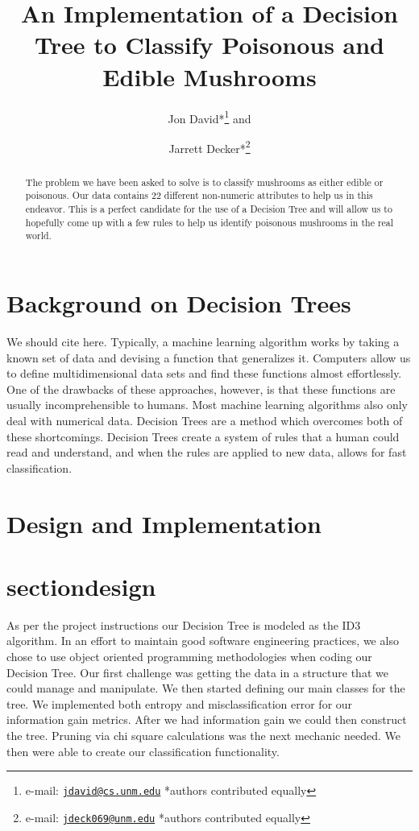 \documentclass{IEEEtran}
\author{Jon David*\thanks{e-mail:
    \href{mailto:jdavid@cs.unm.edu}
         {\texttt{jdavid@cs.unm.edu}}
         {*authors contributed equally}} and
\and
       Jarrett Decker*\thanks{e-mail:
    \href{mailto:p.s.ortegel@gmail.com}
         {\texttt{jdeck069@unm.edu}}
         {*authors contributed equally}}}
\title{An Implementation of a Decision Tree to Classify Poisonous and
  Edible Mushrooms}
\begin{document}
\maketitle

\begin{abstract}

The problem we have been asked to solve is to classify mushrooms as
either edible or poisonous. Our data contains 22 different non-numeric
attributes to help us in this endeavor. This is a perfect candidate
for the use of a Decision Tree and will allow us to hopefully come up
with a few rules to help us identify poisonous mushrooms in the real
world. 
\end{abstract}

\section{Background on Decision Trees}
We should cite \parencite{mitchell1997machine} here.
Typically, a machine learning algorithm works by taking a known set of
data and devising a function that generalizes it. Computers allow us
to define multidimensional data sets and find these functions almost
effortlessly. One of the drawbacks of these approaches, however, is
that these functions are usually incomprehensible to humans. Most
machine learning algorithms also only deal with numerical
data. Decision Trees are a method which overcomes both of these
shortcomings. Decision Trees create a system of rules that a human
could read and understand, and when the rules are applied to new data,
allows for fast classification.


\section{Design and Implementation}
\section{sectiondesign}
As per the project instructions our Decision Tree is modeled as the
ID3 algorithm. In an effort to maintain good software engineering
practices, we also chose to use object oriented programming
methodologies when coding our Decision Tree. Our first challenge was
getting the data in a structure that we could manage and
manipulate. We then started defining our main classes for the tree. We
implemented both entropy and misclassification error for our
information gain metrics. After we had information gain we could then
construct the tree. Pruning via chi square calculations was the next
mechanic needed. We then were able to create our classification
functionality.
\end{document}

